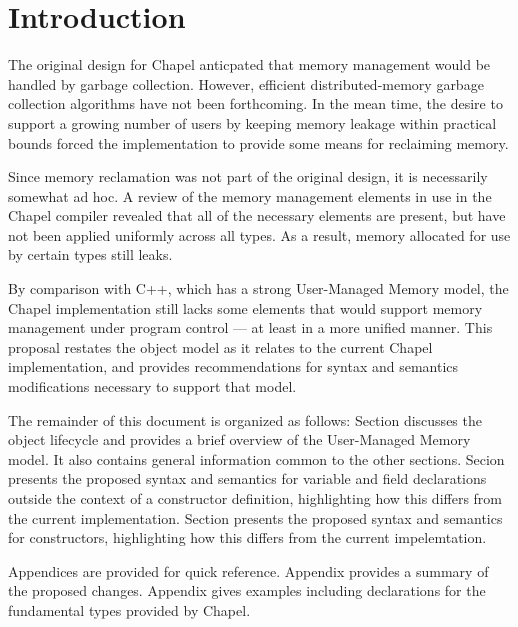 \section{Introduction}

The original design for Chapel anticpated that memory management would be handled
by garbage collection.  However, efficient distributed-memory garbage collection
algorithms have not been forthcoming.  In the mean time, the desire to support a growing
number of users by keeping memory leakage within practical bounds forced the
implementation to provide some means for reclaiming memory.  

Since memory reclamation was not part of the original design, it is necessarily somewhat
ad hoc.  A review of the memory management elements in use in the Chapel compiler revealed
that all of the necessary elements are present, but have not been applied uniformly across
all types.  As a result, memory allocated for use by certain types still leaks.

By comparison with C++, which has a strong User-Managed Memory model, the Chapel
implementation still lacks some elements that would support memory management under
program control --- at least in a more unified manner.  This proposal restates the object
model as it relates to the current Chapel implementation, and provides recommendations for
syntax and semantics modifications necessary to support that model.

The remainder of this document is organized as follows: Section  discusses
the object lifecycle and provides a brief overview of the User-Managed Memory model.  It
also contains general information common to the other sections.  Secion
 presents the proposed syntax and semantics for variable and field
declarations outside the context of a constructor definition, highlighting how this
differs from the current implementation.  Section  presents the
proposed syntax and semantics for constructors, highlighting how this differs from the current impelemtation.

Appendices are provided for quick reference.  Appendix  provides a summary of the
proposed changes.  Appendix  gives examples including declarations for the
fundamental types provided by Chapel.

